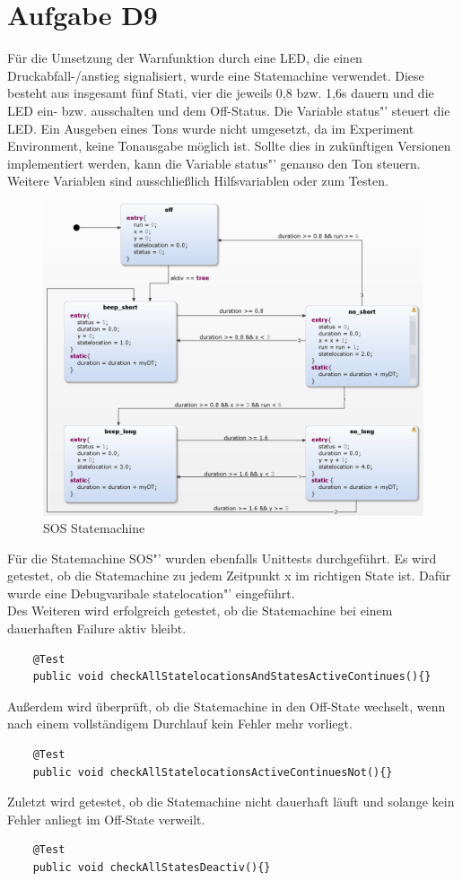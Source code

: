 \chapter{Aufgabe D9}
Für die Umsetzung der Warnfunktion durch eine LED, die einen Druckabfall-/anstieg signalisiert, wurde eine Statemachine verwendet. Diese besteht aus insgesamt fünf Stati, vier die jeweils 0,8 bzw. 1,6s dauern und die LED ein- bzw. ausschalten und dem Off-Status.
Die Variable \glqq status"' steuert die LED. Ein Ausgeben eines Tons wurde nicht umgesetzt, da im Experiment Environment, keine Tonausgabe möglich ist. Sollte dies in zukünftigen Versionen implementiert werden, kann die Variable  \glqq status"' genauso den Ton steuern. Weitere Variablen sind ausschließlich Hilfsvariablen oder zum Testen. 

\begin{figure}[h!]
	\centering
	\includegraphics[width=1\linewidth]{../Graphiken/SOS_state.png}
	\caption{SOS Statemachine}
	\label{fig:SOS_state}
\end{figure}
Für die Statemachine \glqq SOS"' wurden ebenfalls Unittests durchgeführt. Es wird getestet, ob die Statemachine zu jedem Zeitpunkt x im richtigen State ist. Dafür wurde eine Debugvaribale \glqq statelocation"' eingeführt.\\
Des Weiteren wird erfolgreich getestet, ob die Statemachine bei einem dauerhaften Failure aktiv bleibt.
\begin{lstlisting}
	@Test
    public void checkAllStatelocationsAndStatesActiveContinues(){}
  \end{lstlisting}
  
  
  Außerdem wird überprüft, ob die Statemachine in den Off-State wechselt, wenn nach einem vollständigem Durchlauf kein Fehler mehr vorliegt.
\begin{lstlisting}
    @Test
    public void checkAllStatelocationsActiveContinuesNot(){}
   \end{lstlisting} 
   
   
  Zuletzt wird getestet, ob die Statemachine nicht dauerhaft läuft und solange kein Fehler anliegt im Off-State verweilt.
   \begin{lstlisting}
    @Test
    public void checkAllStatesDeactiv(){}
\end{lstlisting}